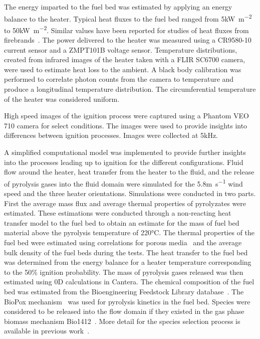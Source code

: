     The energy imparted to the fuel bed was estimated by applying an energy balance to the heater. Typical heat fluxes to the fuel bed ranged from 5\si{\kilo\watt\per\square\meter} to 50\si{\kilo\watt\per\square\meter}. Similar values have been reported for studies of heat fluxes from firebrands~\cite{Hakes2019a, Tao2020}. The power delivered to the heater was measured using a CR9580-10 current sensor and a ZMPT101B voltage sensor. Temperature distributions, created from infrared images of the heater taken with a FLIR SC6700 camera, were used to estimate heat loss to the ambient. A black body calibration was performed to correlate photon counts from the camera to temperature and produce a longitudinal temperature distribution. The circumferential temperature of the heater was considered uniform.
    
    High speed images of the ignition process were captured using a Phantom VEO 710 camera for select conditions. The images were used to provide insights into differences between ignition processes. Images were collected at 5\si{\kilo\hertz}. 
    
    A simplified computational model was implemented to provide further insights into the processes leading up to ignition for the different configurations. Fluid flow around the heater, heat transfer from the heater to the fluid, and the release of pyrolysis gases into the fluid domain were simulated for the 5.8\si{\meter\per\second} wind speed and the three heater orientations. Simulations were conducted in two parts. First the average mass flux and average thermal properties of pyrolyzates were estimated. These estimations were conducted through a non-reacting heat transfer model to the fuel bed to obtain an estimate for the mass of fuel bed material above the pyrolysis temperature of 220\si{\celsius}. The thermal properties of the fuel bed were estimated using correlations for porous media~\cite{bergman2011fundamentals} and the average bulk density of the fuel beds during the tests. The heat transfer to the fuel bed was determined from the energy balance for a heater temperature corresponding to the 50\% ignition probability. The mass of pyrolysis gases released was then estimated using 0D calculations in Cantera. The chemical composition of the fuel bed was estimated from the Bioengineering Feedstock Library database~\cite{feedstock}. The BioPox mechanism~\cite{Dhahak2019} was used for pyrolysis kinetics in the fuel bed. Species were considered to be released into the flow domain if they existed in the gas phase biomass mechanism Bio1412~\cite{Ranzi2008}. More detail for the species selection process is available in previous work~\cite{Bean2021}.
    

